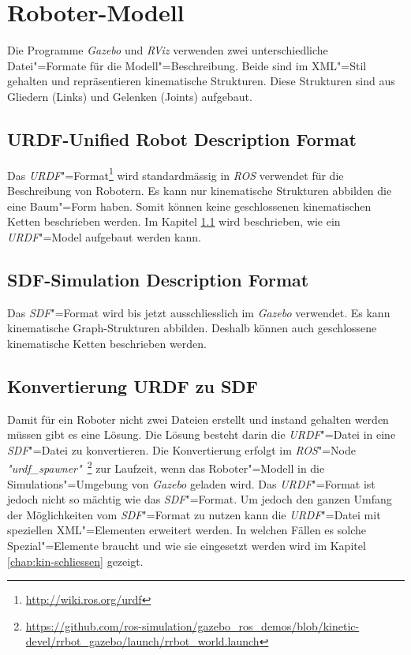 \section{Roboter-Modell} %
\label{chap:roboter-modell}
Die Programme \textit{Gazebo} und \textit{RViz} verwenden zwei unterschiedliche Datei"=Formate für die Modell"=Beschreibung.
Beide sind im XML"=Stil gehalten und repräsentieren kinematische Strukturen.
Diese Strukturen sind aus Gliedern (Links) und Gelenken (Joints) aufgebaut.

\subsection{URDF-Unified Robot Description Format}
\label{chap:urdf}
Das \textit{URDF}"=Format\footnote{\url{http://wiki.ros.org/urdf}} wird standardmässig in \textit{ROS} verwendet für die Beschreibung von Robotern.
Es kann nur kinematische Strukturen abbilden die eine Baum"=Form haben.
Somit können keine geschlossenen kinematischen Ketten beschrieben werden.
Im Kapitel \ref{chap:urdf} wird beschrieben, wie ein \textit{URDF}"=Model aufgebaut werden kann.

\subsection{SDF-Simulation Description Format}
\label{chap:sdf}
Das \textit{SDF}"=Format wird bis jetzt ausschliesslich im \textit{Gazebo} verwendet.
Es kann kinematische Graph-Strukturen abbilden.
Deshalb können auch geschlossene kinematische Ketten beschrieben werden.

\subsection{Konvertierung URDF zu SDF}
\label{chap:konvertierung}
Damit für ein Roboter nicht zwei Dateien erstellt und instand gehalten werden müssen gibt es eine Lösung.
Die Lösung besteht darin die \textit{URDF}"=Datei in eine \textit{SDF}"=Datei zu konvertieren.
Die Konvertierung erfolgt im \textit{ROS}"=Node \textit{\textit{"}urdf\_spawner"}~\footnote{\url{https://github.com/ros-simulation/gazebo\_ros\_demos/blob/kinetic-devel/rrbot\_gazebo/launch/rrbot\_world.launch}} zur Laufzeit, wenn das Roboter"=Modell in die Simulations"=Umgebung von \textit{Gazebo} geladen wird.
Das \textit{URDF}"=Format ist jedoch nicht so mächtig wie das \textit{SDF}"=Format.
Um jedoch den ganzen Umfang der Möglichkeiten vom \textit{SDF}"=Format zu nutzen kann die \textit{URDF}"=Datei mit speziellen XML"=Elementen erweitert werden.
In welchen Fällen es solche Spezial"=Elemente braucht und wie sie eingesetzt werden wird im Kapitel \ref{chap:kin-schliessen} gezeigt. 


